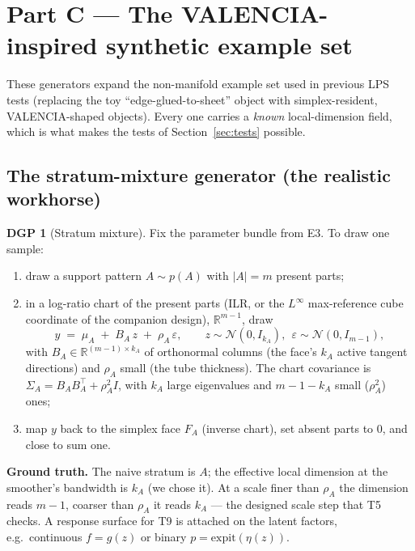 \documentclass[11pt]{article}
\theoremstyle{definition}
\newtheorem{dgp}{DGP}[section]
\newcommand{\R}{\mathbb{R}}
\begin{document}
\section{Part C --- The VALENCIA-inspired synthetic example set}\label{sec:synthetic}

These generators expand the non-manifold example set used in previous LPS tests
(replacing the toy ``edge-glued-to-sheet'' object with simplex-resident,
VALENCIA-shaped objects). Every one carries a \emph{known} local-dimension field,
which is what makes the tests of Section~\ref{sec:tests} possible.

\subsection{The stratum-mixture generator (the realistic workhorse)}
\begin{dgp}[Stratum mixture]\label{dgp:mix}
Fix the parameter bundle from E3. To draw one sample:
\begin{enumerate}[leftmargin=1.5em,nosep]
\item draw a support pattern $A\sim p(A)$ with $|A|=m$ present parts;
\item in a log-ratio chart of the present parts (ILR, or the $L^\infty$
max-reference cube coordinate of the companion design), $\R^{m-1}$, draw
\[
  y \;=\; \mu_A \;+\; B_A\,z \;+\; \rho_A\,\varepsilon,
  \qquad z\sim\mathcal N(0,I_{k_A}),\ \ \varepsilon\sim\mathcal N(0,I_{m-1}),
\]
with $B_A\in\R^{(m-1)\times k_A}$ of orthonormal columns (the face's $k_A$ active
tangent directions) and $\rho_A$ small (the tube thickness). The chart covariance
is $\Sigma_A = B_AB_A^{\!\top}+\rho_A^2 I$, with $k_A$ large eigenvalues and
$m-1-k_A$ small ($\rho_A^2$) ones;
\item map $y$ back to the simplex face $F_A$ (inverse chart), set absent parts to
$0$, and close to sum one.
\end{enumerate}
\textbf{Ground truth.} The naive stratum is $A$; the effective local dimension at
the smoother's bandwidth is $k_A$ (we chose it). At a scale finer than $\rho_A$ the
dimension reads $m-1$, coarser than $\rho_A$ it reads $k_A$ --- the designed
scale step that T5 checks. A response surface for T9 is attached on the latent
factors, e.g.\ continuous $f=g(z)$ or binary $p=\mathrm{expit}(\eta(z))$.
\end{dgp}
\end{document}
